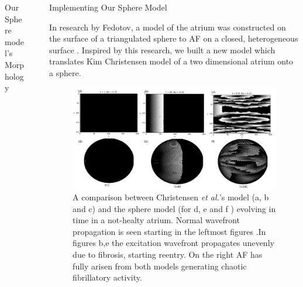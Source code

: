 \documentclass[final,hyperref={pdfpagelabels=false}]{beamer}
\begin{document}
\begin{frame}[t]
\begin{columns}[t]
\begin{column}{.465\textwidth}
\begin{block}{Our Sphere model's Morphology}
\end{block}




\end{column} %

\begin{column}{.03\textwidth}\end{column} %
 
\begin{column}{.465\textwidth} %









\begin{block}{Implementing Our Sphere Model}




In research by Fedotov, a model of the atrium was constructed on the surface of a triangulated sphere to AF on a closed, heterogeneous surface \cite{Fedotov}. Inspired by this research, we built a new model which translates Kim Christensen model of a two dimensional atrium onto a sphere.



\begin{figure}
\includegraphics[width=0.8\linewidth]{combchristensenspherefib}
\caption{A comparison between Christensen \emph{et al.}'s model  (a, b and c)  and the sphere model (for d, e and f ) evolving in time in a not-healty atrium. Normal wavefront propagation is seen starting in the leftmost figures .In figures b,e the excitation wavefront propagates unevenly due to fibrosis, starting reentry. On the right AF has fully arisen from both models generating chaotic fibrillatory activity.}
\end{figure}


\end{block}
\end{column}
\end{columns}
\end{frame}
\end{document}

